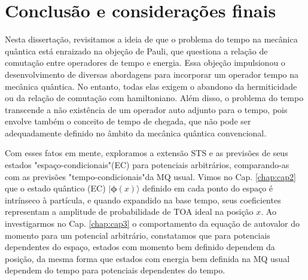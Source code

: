\chapter{Conclusão e considerações finais}
\label{chap:conclusao}


Nesta dissertação, revisitamos a ideia de que o problema do tempo na mecânica quântica está enraizado na objeção de Pauli, que questiona a relação de comutação entre operadores de tempo e energia. Essa objeção impulsionou o desenvolvimento de diversas abordagens para incorporar um operador tempo na mecânica quântica. No entanto, todas elas exigem o abandono da hermiticidade ou da relação de comutação com hamiltoniano. Além disso, o problema do tempo transcende a não existência de um operador auto adjunto para o tempo, pois envolve também o conceito de tempo de chegada, que não pode ser adequadamente definido no âmbito da mecânica quântica convencional.


Com esses fatos em mente, exploramos a extensão STS e as previsões de seus estados "espaço-condicionais"\text{ }(EC) para potenciais arbitrários, comparando-as com as previsões "tempo-condicionais"\text{ }da MQ usual. Vimos no Cap. \ref{chap:cap2} que o estado quântico (EC) $|\pmb{\phi}(x)\rangle$ definido em cada ponto do espaço é intrínseco à partícula, e quando expandido na base tempo, seus coeficientes representam a amplitude de probabilidade de TOA ideal na posição $x$. Ao investigarmos no Cap. \ref{chap:cap3} o comportamento da equação de autovalor do momento para um potencial arbitrário, constatamos que para potenciais dependentes do espaço, estados com momento bem definido dependem da posição, da mesma forma que estados com energia bem definida na MQ usual dependem do tempo para potenciais dependentes do tempo.


